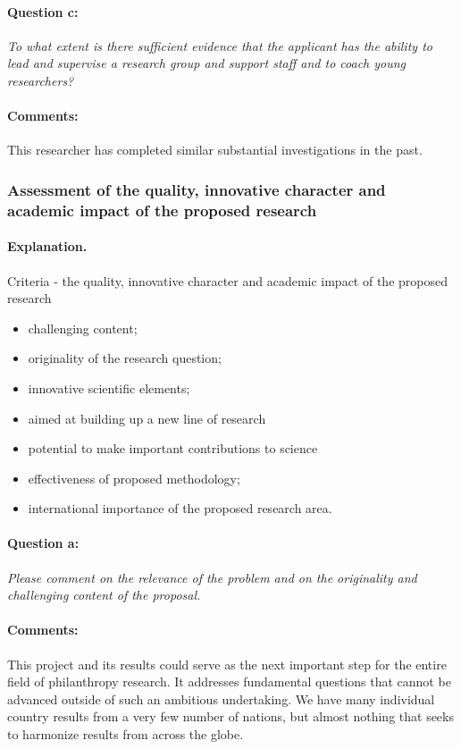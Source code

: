 \documentclass[twocolumn, serif, rga, numeric]{jote-article}
\begin{document}
\paragraph{Question c:}
\textit{To what extent is there sufficient evidence that the applicant has the ability to lead and supervise a research group and support staff and to coach young researchers?}
\paragraph{Comments:}
This researcher has completed similar substantial investigations in the past.

 {}\subsubsection*{Assessment of the quality, innovative character and academic impact of the proposed research} 
\paragraph{Explanation.}
Criteria - the quality, innovative character and academic impact of the proposed research 
\begin{itemize} 
\item challenging content; \item originality of the research question; \item innovative scientific elements; \item aimed at building up a new line of research\item potential to make important contributions to science\item effectiveness of proposed methodology; \item international importance of the proposed research area.
\end{itemize}
\paragraph{Question a:}
\textit{Please comment on the relevance of the problem and on the originality and challenging content of the proposal.}
\paragraph{Comments:}
This project and its results could serve as the next important step for the entire field of philanthropy research. It addresses fundamental questions that cannot be advanced outside of such an ambitious undertaking. We have many individual country results from a very few number of nations, but almost nothing that seeks to harmonize results from across the globe.
\end{document}
